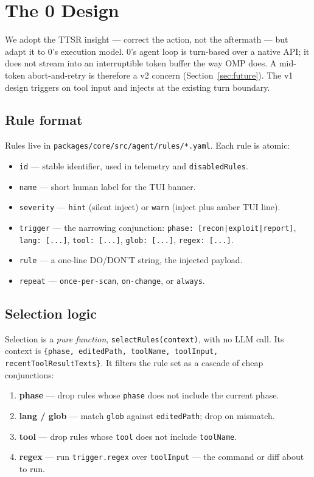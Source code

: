 \documentclass[11pt]{article}
\begin{document}
\section{The 0 Design}
\label{sec:design}

We adopt the TTSR insight --- correct the action, not the aftermath --- but
adapt it to 0's execution model. 0's agent loop is turn-based over a native
API; it does not stream into an interruptible token buffer the way OMP does.
A mid-token abort-and-retry is therefore a v2 concern (Section~\ref{sec:future}).
The v1 design triggers on tool input and injects at the existing turn boundary.

\subsection{Rule format}

Rules live in \texttt{packages/core/src/agent/rules/*.yaml}. Each rule is atomic:

\begin{itemize}[leftmargin=*,itemsep=1pt]
  \item \texttt{id} --- stable identifier, used in telemetry and \texttt{disabledRules}.
  \item \texttt{name} --- short human label for the TUI banner.
  \item \texttt{severity} --- \texttt{hint} (silent inject) or \texttt{warn} (inject plus amber TUI line).
  \item \texttt{trigger} --- the narrowing conjunction: \texttt{phase: [recon|exploit|report]}, \texttt{lang: [...]}, \texttt{tool: [...]}, \texttt{glob: [...]}, \texttt{regex: [...]}.
  \item \texttt{rule} --- a one-line DO/DON'T string, the injected payload.
  \item \texttt{repeat} --- \texttt{once-per-scan}, \texttt{on-change}, or \texttt{always}.
\end{itemize}

\subsection{Selection logic}

Selection is a \emph{pure function}, \texttt{selectRules(context)}, with no LLM
call. Its context is
\texttt{\{phase, editedPath, toolName, toolInput, recentToolResultTexts\}}. It
filters the rule set as a cascade of cheap conjunctions:

\begin{enumerate}[leftmargin=*,itemsep=1pt]
  \item \textbf{phase} --- drop rules whose \texttt{phase} does not include the current phase.
  \item \textbf{lang / glob} --- match \texttt{glob} against \texttt{editedPath}; drop on mismatch.
  \item \textbf{tool} --- drop rules whose \texttt{tool} does not include \texttt{toolName}.
  \item \textbf{regex} --- run \texttt{trigger.regex} over \texttt{toolInput} --- the command or diff about to run.
\end{enumerate}
\end{document}
